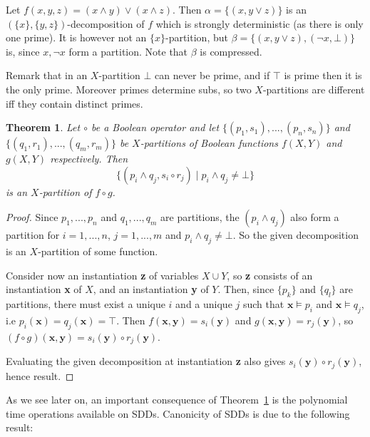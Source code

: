 \documentclass[11pt]{report}
\newtheorem{theorem}{Theorem}[section]
\newenvironment{example}[1][Example]{\begin{trivlist}
\item[\hskip \labelsep {\bfseries #1}]}{\end{trivlist}}
\begin{document}
\begin{example} 
Let $f(x, y, z) = (x \land y) \lor (x \land z)$. Then $\alpha = \{(x, y\lor z)\}$ is an $(\{x\}, \{y, z\})$-decomposition of $f$ which is strongly deterministic (as there is only one prime). It is however not an $\{x\}$-partition, but $\beta = \{(x, y\lor z), (\lnot x, \bot)\}$ is, since $x, \lnot x$ form a partition. Note that $\beta$ is compressed. 
\end{example}

\noindent Remark that in an $X$-partition $\bot$ can never be prime, and if $\top$ is prime then it is the only prime. Moreover primes determine subs, so two $X$-partitions are different iff they contain distinct primes.

\begin{theorem}
\label{theorem_apply}
Let $\circ$ be a Boolean operator and let $\{(p_1, s_1),...,(p_n, s_n)\}$ and $\{(q_1, r_1),...,(q_m, r_m)\}$  be $X$-partitions of Boolean functions $f(X, Y)$ and $g(X, Y)$ respectively. Then $$\{(p_i \land q_j, s_i \circ r_j) \mid  p_i \land q_j  \neq \bot \}$$ is an $X$-partition of $f \circ g$.
\end{theorem}
\begin{proof}
 Since $p_1, ..., p_n$ and $q_1, ..., q_m$ are partitions, the $(p_i \land q_j)$ also form a partition for $i = 1, ..., n$, $j = 1, ..., m$ and $p_i \land q_j \neq \bot$. So the given decomposition is an $X$-partition of some function.

Consider now an instantiation \textbf{z} of variables $X\cup Y$, so \textbf{z} consists of an instantiation \textbf{x} of $X$, and an instantiation \textbf{y} of $Y$. 
Then, since $\{p_k\}$ and $\{q_l\}$ are partitions, there must exist a unique $i$ and a unique $j$ such that $\textbf{x} \models p_i$ and $\textbf{x} \models q_j$, i.e $p_i(\textbf{x}) = q_j(\textbf{x}) = \top$. Then $f(\textbf{x}, \textbf{y}) = s_i(\textbf{y})$ and $g(\textbf{x}, \textbf{y}) = r_j(\textbf{y})$, so $(f\circ g)(\textbf{x}, \textbf{y}) = s_i(\textbf{y})\circ r_j(\textbf{y}).$

Evaluating the given decomposition at instantiation \textbf{z} also gives $s_i(\textbf{y}) \circ r_j(\textbf{y})$, hence result. 
\end{proof}

As we see later on, an important consequence of Theorem~\ref{theorem_apply} is the polynomial time operations available on SDDs. Canonicity of SDDs is due to the following result:
\end{document}
